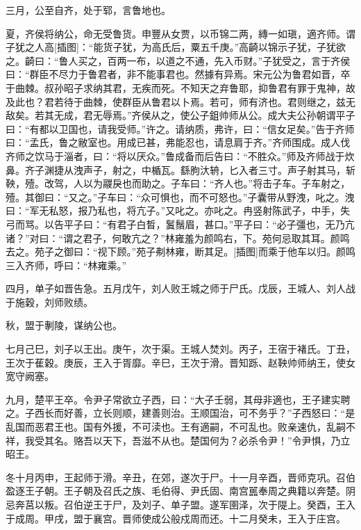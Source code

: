 \documentclass[a4paper,12pt,UTF8,twoside]{ctexbook}
\begin{document}
三月，公至自齐，处于郓，言鲁地也。

夏，齐侯将纳公，命无受鲁货。申豐从女贾，以币锦二两，縳一如瑱，適齐师。谓子犹之人高[插图]：“能货子犹，为高氏后，粟五千庚。”高齮以锦示子犹，子犹欲之。齮曰：“鲁人买之，百两一布，以道之不通，先入币财。”子犹受之，言于齐侯曰：“群臣不尽力于鲁君者，非不能事君也。然據有异焉。宋元公为鲁君如晋，卒于曲棘。叔孙昭子求纳其君，无疾而死。不知天之弃鲁耶，抑鲁君有罪于鬼神，故及此也？君若待于曲棘，使群臣从鲁君以卜焉。若可，师有济也。君则继之，兹无敌矣。若其无成，君无辱焉。”齐侯从之，使公子鉏帅师从公。成大夫公孙朝谓平子曰：“有都以卫国也，请我受师。”许之。请纳质，弗许，曰：“信女足矣。”告于齐师曰：“孟氏，鲁之敝室也。用成已甚，弗能忍也，请息肩于齐。”齐师围成。成人伐齐师之饮马于淄者，曰：“将以厌众。”鲁成备而后告曰：“不胜众。”师及齐师战于炊鼻。齐子渊捷从洩声子，射之，中楯瓦。繇朐汏辀，匕入者三寸。声子射其马，斩鞅，殪。改驾，人以为鬷戾也而助之。子车曰：“齐人也。”将击子车。子车射之，殪。其御曰：“又之。”子车曰：“众可惧也，而不可怒也。”子囊带从野洩，叱之。洩曰：“军无私怒，报乃私也，将亢子。”又叱之。亦叱之。冉竖射陈武子，中手，失弓而骂。以告平子曰：“有君子白晳，鬒鬚眉，甚口。”平子曰：“必子彊也，无乃亢诸？”对曰：“谓之君子，何敢亢之？”林雍羞为颜鸣右，下。苑何忌取其耳。颜鸣去之。苑子之御曰：“视下顾。”苑子刜林雍，断其足。[插图]而乘于他车以归。颜鸣三入齐师，呼曰：“林雍乘。”

四月，单子如晋告急。五月戊午，刘人败王城之师于尸氏。戊辰，王城人、刘人战于施穀，刘师败绩。

秋，盟于剸陵，谋纳公也。

七月己巳，刘子以王出。庚午，次于渠。王城人焚刘。丙子，王宿于褚氏。丁丑，王次于萑穀。庚辰，王入于胥靡。辛巳，王次于滑。晋知跞、赵鞅帅师纳王，使女宽守阙塞。

九月，楚平王卒。令尹子常欲立子西，曰：“大子壬弱，其母非適也，王子建实聘之。子西长而好善，立长则顺，建善则治。王顺国治，可不务乎？”子西怒曰：“是乱国而恶君王也。国有外援，不可渎也。王有適嗣，不可乱也。败亲速仇，乱嗣不祥，我受其名。赂吾以天下，吾滋不从也。楚国何为？必杀令尹！”令尹惧，乃立昭王。

冬十月丙申，王起师于滑。辛丑，在郊，遂次于尸。十一月辛酉，晋师克巩。召伯盈逐王子朝。王子朝及召氏之族、毛伯得、尹氏固、南宫嚚奉周之典籍以奔楚。阴忌奔莒以叛。召伯逆王于尸，及刘子、单子盟。遂军圉泽，次于隄上。癸酉，王入于成周。甲戌，盟于襄宫。晋师使成公般戍周而还。十二月癸未，王入于庄宫。
\end{document}
